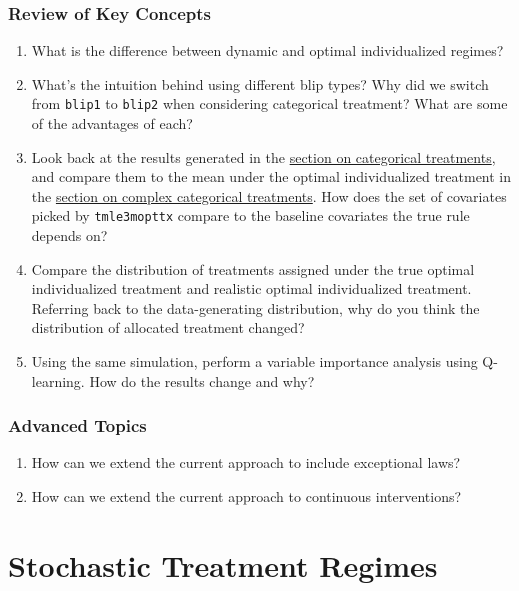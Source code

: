 \documentclass[
  12pt, krantz2,
]{krantz}
\newcommand{\passthrough}[1]{#1}
\newcommand{\1}{\mathbbm{1}}
\theoremstyle{definition}
\theoremstyle{definition}
\theoremstyle{definition}
\theoremstyle{definition}
\theoremstyle{remark}
\begin{document}
\hypertarget{review-of-key-concepts-1}{%
\subsection{Review of Key Concepts}\label{review-of-key-concepts-1}}

\begin{enumerate}
\def\labelenumi{\arabic{enumi}.}
\item
  What is the difference between dynamic and optimal individualized regimes?
\item
  What's the intuition behind using different blip types? Why did we switch
  from \passthrough{\lstinline!blip1!} to \passthrough{\lstinline!blip2!} when considering categorical treatment? What are some
  of the advantages of each?
\item
  Look back at the results generated in the \protect\hyperlink{oit-eval-cat-v1}{section on categorical
  treatments}, and compare them to the mean under the optimal
  individualized treatment in the \protect\hyperlink{oit-eval-bin-v2}{section on complex categorical
  treatments}. How does the set of covariates picked by \passthrough{\lstinline!tmle3mopttx!}
  compare to the baseline covariates the true rule depends on?
\item
  Compare the distribution of treatments assigned under the true optimal
  individualized treatment and realistic optimal individualized treatment.
  Referring back to the data-generating distribution, why do you think the
  distribution of allocated treatment changed?
\item
  Using the same simulation, perform a variable importance analysis using
  Q-learning. How do the results change and why?
\end{enumerate}

\hypertarget{advanced-topics-1}{%
\subsection{Advanced Topics}\label{advanced-topics-1}}

\begin{enumerate}
\def\labelenumi{\arabic{enumi}.}
\item
  How can we extend the current approach to include exceptional laws?
\item
  How can we extend the current approach to continuous interventions?
\end{enumerate}

\hypertarget{stochastic-treatment-regimes}{%
\chapter{Stochastic Treatment Regimes}\label{stochastic-treatment-regimes}}
\end{document}
